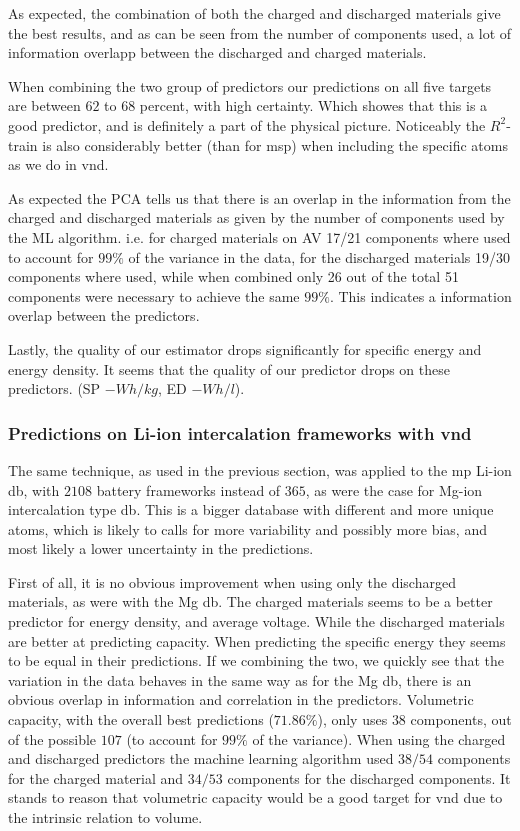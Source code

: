 As expected, the combination of both the charged and discharged materials give the best results, and as can be seen from the number of components used, a lot of information overlapp between the discharged and charged materials. 

When combining the two group of predictors our predictions on all five targets are between $62$ to $68$ percent, with high certainty. Which showes that this is a good predictor, and is definitely a part of the physical picture. Noticeably the $R^2$-train is also considerably better (than for msp) when including the specific atoms as we do in vnd.  

As expected the PCA tells us that there is an overlap in the information from the charged and discharged materials as given by the number of components used by the ML algorithm. i.e. for charged materials on AV 17/21 components where used to account for $99\%$ of the variance in the data, for the discharged materials 19/30 components where used, while when combined only 26 out of the total 51 components were necessary to achieve the same $99\%$. This indicates a information overlap between the predictors. 

Lastly, the quality of our estimator drops significantly for specific energy and energy density. It seems that the quality of our predictor drops on these predictors. (SP $- \si{Wh/kg}$, ED $- \si{Wh/l}$). 


\subsubsection*{Predictions on Li-ion intercalation frameworks with vnd}
The same technique, as used in the previous section, was applied to the mp Li-ion db, with $2108$ battery frameworks instead of $365$, as were the case for Mg-ion intercalation type db. This is a bigger database with different and more unique atoms, which is likely to calls for more variability and possibly more bias, and most likely a lower uncertainty in the predictions. 

First of all, it is no obvious improvement when using only the discharged materials, as were with the Mg db. The charged materials seems to be a better predictor for energy density, and average voltage. While the discharged materials are better at predicting capacity. When predicting the specific energy they seems to be equal in their predictions. 
If we combining the two, we quickly see that the variation in the data behaves in the same way as for the Mg db, there is an obvious overlap in information and correlation in the predictors. Volumetric capacity, with the overall best predictions ($71.86\%$), only uses $38$ components, out of the possible $107$ (to account for $99\%$ of the variance). When using the charged and discharged predictors the machine learning algorithm used $38/54$ components for the charged material and $34/53$ components for the discharged components. It stands to reason that volumetric capacity would be a good target for vnd due to the intrinsic relation to volume.


